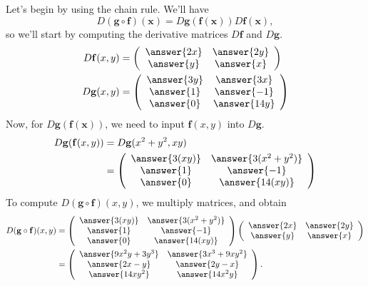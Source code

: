 \documentclass{ximera}
\begin{document}
\begin{example}
Let's begin by using the chain rule. We'll have 
\[
 D(\mathbf{g}\circ\mathbf{f})(\mathbf{x}) = D\mathbf{g}(\mathbf{f}(\mathbf{x}))D\mathbf{f}(\mathbf{x}),
\]
so we'll start by computing the derivative matrices $D\mathbf{f}$ and $D\mathbf{g}$.
\begin{align*}
D\mathbf{f}(x,y) &= \left(\begin{array}{cc}\answer{2x} & \answer{2y}\\\answer{y} & \answer{x}\end{array}\right)\\
D\mathbf{g}(x,y) &= \left(\begin{array}{cc}\answer{3y} & \answer{3x}\\\answer{1} & \answer{-1}\\\answer{0} & \answer{14y}\end{array}\right)
\end{align*}
Now, for $D\mathbf{g}(\mathbf{f}(\mathbf{x}))$, we need to input $\mathbf{f}(x,y)$ into $D\mathbf{g}$.
\begin{align*}
D\mathbf{g}(\mathbf{f}(x,y)) &= D\mathbf{g}(x^2+y^2, xy)\\
&= \left(\begin{array}{cc}\answer{3(xy)} & \answer{3(x^2+y^2)}\\\answer{1} & \answer{-1}\\\answer{0} & \answer{14(xy)}\end{array}\right)
\end{align*}
To compute $ D(\mathbf{g}\circ\mathbf{f})(x,y)$, we multiply matrices, and obtain
\begin{align*}
D(\mathbf{g}\circ\mathbf{f})(x,y) &=  \left(\begin{array}{cc}\answer{3(xy)} & \answer{3(x^2+y^2)}\\\answer{1} & \answer{-1}\\\answer{0} & \answer{14(xy)}\end{array}\right)\left(\begin{array}{cc}\answer{2x} & \answer{2y}\\\answer{y} & \answer{x}\end{array}\right)\\
&= \left(\begin{array}{cc}\answer{9x^2y+3y^3} & \answer{3x^3+9xy^2}\\\answer{2x-y} & \answer{2y-x}\\\answer{14xy^2} & \answer{14x^2y}\end{array}\right).
\end{align*}


\end{example}
\end{document}
